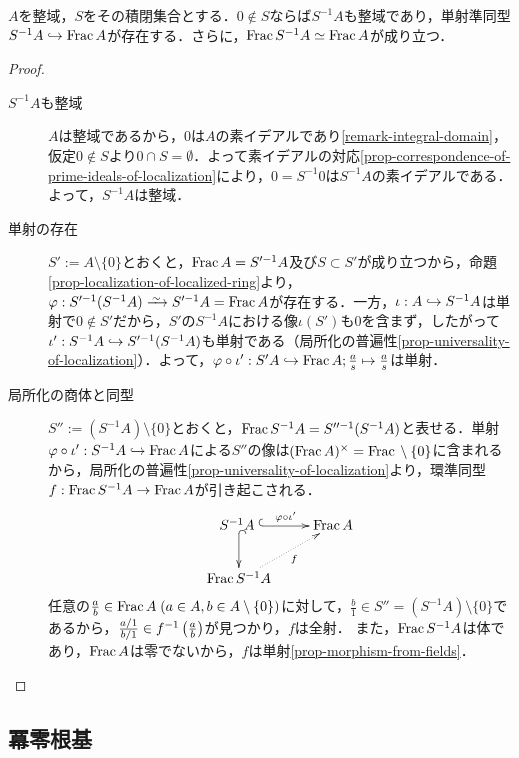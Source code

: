 \documentclass[uplatex,dvipdfmx]{jsreport}
\begin{document}
\begin{proposition}[整域の局所化に於ける商体の立ち位置]\label{prop-localization-of-integral-domains}
    $A$を整域，$S$をその積閉集合とする．$0\notin S$ならば$S^{-1}A$も整域であり，単射準同型$S^{-1}A\hookrightarrow\mathrm{Frac}\, A$が存在する．さらに，$\mathrm{Frac}\, S^{-1}A\simeq\mathrm{Frac}\, A$が成り立つ．
\end{proposition}
\begin{proof}\mbox{}
    \begin{description}
        \item[$S^{-1}A$も整域] 
        $A$は整域であるから，$0$は$A$の素イデアルであり\ref{remark-integral-domain}，仮定$0\notin S$より$0\cap S=\emptyset$．よって素イデアルの対応\ref{prop-correspondence-of-prime-ideals-of-localization}により，$0=S^{-1}0$は$S^{-1}A$の素イデアルである．よって，$S^{-1}A$は整域．
        \item[単射の存在]
        $S':=A\setminus\{0\}$とおくと，$\mathrm{Frac}\, A=S'^{-1}A$及び$S\subset S'$が成り立つから，命題\ref{prop-localization-of-localized-ring}より，$\varphi:S'^{-1}(S^{-1}A)\iso S'^{-1}A=\Frac A$が存在する．一方，$\iota:A\hookrightarrow S^{-1}A$は単射で$0\notin S'$だから，$S'$の$S^{-1}A$における像$\iota(S')$も$0$を含まず，したがって$\iota':S^{-1}A\hookrightarrow S'^{-1}(S^{-1}A)$も単射である（局所化の普遍性\ref{prop-universality-of-localization}）．よって，$\varphi\circ\iota':S'A\hookrightarrow\mathrm{Frac}\, A;\frac{a}{s}\mapsto\frac{a}{s}$は単射．
        \item[局所化の商体と同型]
        $S'':=(S^{-1}A)\setminus\{0\}$とおくと，$\mathrm{Frac}\, S^{-1}A=S''^{-1}(S^{-1}A)$と表せる．単射$\varphi\circ\iota':S^{-1}A\hookrightarrow\mathrm{Frac}\, A$による$S''$の像は$(\mathrm{Frac}\, A)^\times=\mathrm{Frac}\,\setminus\{0\}$に含まれるから，局所化の普遍性\ref{prop-universality-of-localization}より，環準同型$f:\mathrm{Frac}\, S^{-1}A\to\mathrm{Frac}\, A$が引き起こされる．
        \[\xymatrix{
            S^{-1}A\;\ar@{^{(}->}[r]^-{\varphi\circ\iota'}\ar@{^{(}->}[d]&\Frac A\\
            \Frac S^{-1}A\ar@{.>}[ur]_-f
        }\]
        任意の$\frac{a}{b}\in\mathrm{Frac}\, A\;(a\in A,b\in A\setminus\{0\})$に対して，$\frac{b}{1}\in S''=(S^{-1}A)\setminus\{0\}$であるから，$\frac{a/1}{b/1}\in f^{-1}\left(\frac{a}{b}\right)$が見つかり，$f$は全射．
        また，$\mathrm{Frac}\, S^{-1}A$は体であり，$\mathrm{Frac}\, A$は零でないから，$f$は単射\ref{prop-morphism-from-fields}．
    \end{description}
\end{proof}

\subsection{冪零根基}
\end{document}
